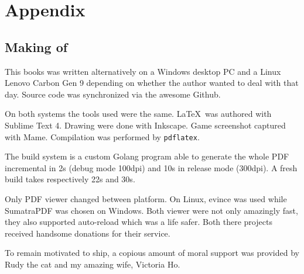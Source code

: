 \chapter{Appendix} 

\section{Making of}

This books was written alternatively on a Windows desktop PC and a Linux Lenovo Carbon Gen 9 depending on whether the author wanted to deal with  that day. Source code was synchronized via the awesome Github.

On both systems the tools used were the same. \LaTeX\ was authored with Sublime Text 4. Drawing were done with Inkscape. Game screenshot captured with Mame. Compilation was performed by \texttt{pdflatex}.

The build system is a custom Golang program able to generate the whole PDF incremental in 2s (debug mode 100dpi) and 10s in release mode (300dpi). A fresh build takes respectively 22s and 30s.

Only PDF viewer changed between platform. On Linux, evince was used while SumatraPDF was chosen on Windows. Both viewer were not only amazingly fast, they also supported auto-reload which was a life safer. Both there projects received handsome donations for their service.

To remain motivated to ship, a copious amount of moral support was provided by Rudy the cat and my amazing wife, Victoria Ho.
